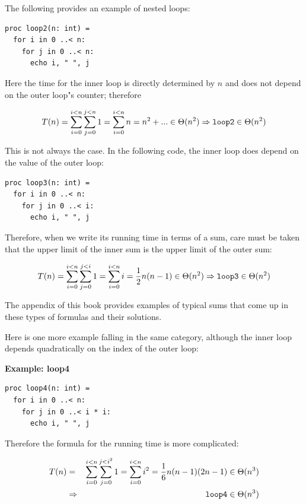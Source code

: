 \documentclass[justified, sixbynine]{tufte-book}
\def\subsubsection#1{{\bf #1}}
\theoremstyle{plain}%
\newtheorem * {corollary}{Corollary}
\theoremstyle{definition}
\theoremstyle{remark}
\newtheorem * {remark}{Remark}
\newtheorem * {note}{Note}
\begin{document}
\begin{fullwidth}
The following provides an example of nested loops:

\begin{lstlisting}
proc loop2(n: int) =
  for i in 0 ..< n:
    for j in 0 ..< n:
      echo i, " ", j
\end{lstlisting}

Here the time for the inner loop is directly determined by $n$ and does not depend on the outer loop"s counter; therefore

\begin{equation}
T(n)=\sum_{i=0}^{i<n}\sum_{j=0}^{j<n}1=\sum_{i=0}^{i<n}n=n^2+...\in \Theta
(n^2)\Rightarrow \text{{\tt loop2}}\in \Theta (n^2)
\end{equation}

This is not always the case. In the following code, the inner loop does depend on the value of the outer loop:

\begin{lstlisting}
proc loop3(n: int) =
  for i in 0 ..< n:
    for j in 0 ..< i:
      echo i, " ", j
\end{lstlisting}

Therefore, when we write its running time in terms of a sum, care must be taken that the upper limit of the inner sum is the upper limit of the outer sum:

\begin{equation}
T(n)=\sum_{i=0}^{i<n}\sum_{j=0}^{j<i}1=\sum_{i=0}^{i<n}i=\frac 12n(n-1)\in
\Theta (n^2)\Rightarrow \text{{\tt loop3}}\in \Theta (n^2)
\end{equation}

The appendix of this book provides examples of typical sums that come up in these types of formulas and their solutions.

Here is one more example falling in the same category, although the inner loop depends quadratically on the index of the outer loop:

\subsubsection{Example: loop4}
\begin{lstlisting}
proc loop4(n: int) =
  for i in 0 ..< n:
    for j in 0 ..< i * i:
      echo i, " ", j
\end{lstlisting}

Therefore the formula for the running time is more complicated:

\begin{eqnarray}
T(n) &=&\sum_{i=0}^{i<n}\sum_{j=0}^{j<i^2}1=\sum_{i=0}^{i<n}i^2=\frac
16n(n-1)(2n-1)\in \Theta (n^3) \\
&\Rightarrow &\text{{\tt loop4}}\in \Theta (n^3)
\end{eqnarray}


\end{fullwidth}
\end{document}
